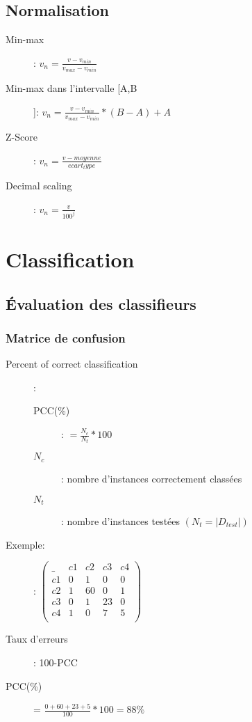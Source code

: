 \section{Normalisation}

\begin{description}
\item[Min-max]: $v_n = \frac{v-v_{min}}{v_{max} - v_{min}}$
\item[Min-max dans l'intervalle [A,B]]: $v_n = \frac{v-v_{min}}{v_{max} - v_{min}} * (B-A) + A$
\item[Z-Score]: $v_n = \frac{v - moyenne}{ecart_type}$
\item[Decimal scaling]: $v_n = \frac{v}{100^j}$
\end{description}

\pagebreak
\chapter{Classification}
\section{Évaluation des classifieurs}
\subsection{Matrice de confusion}
\begin{description}
\item[Percent of correct classification]:
\begin{description}
\item[PCC(\%)]: $ = \frac{N_c}{N_t} * 100$
\item[$N_c$]: nombre d'instances correctement classées
\item[$N_t$]: nombre d'instances testées $(N_t = |D_{test}|)$
\end{description} 
\end{description}

Exemple:\\
\begin{description}
\item[]: $\begin{pmatrix}
  \_  & c1 & c2 & c3 & c4 \\
   c1 & 0  & 1  &  0 & 0  \\
   c2 & 1  & 60 &  0 & 1  \\
   c3 & 0  & 1  & 23 & 0  \\
   c4 & 1  & 0  &  7 & 5  \\
\end{pmatrix}$
\item[Taux d'erreurs]: 100-PCC
\item[PCC(\%)] = $ \frac{0+60+23+5}{100} * 100 = 88\% $ 
\end{description}

